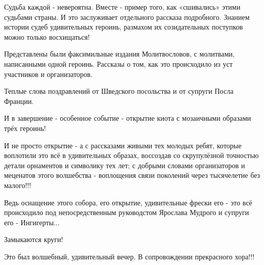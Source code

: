 Судьба каждой - невероятна. Вместе - пример того, как «сшивались» этими
судьбами страны. И это заслуживает отдельного рассказа подробного. Знанием
истории судеб удивительных героинь, размахом их созидательных поступков можно
только восхищаться! 


Представлены были факсимильные издания Молитвословов, с молитвами, написанными
одной героинь. Рассказы о том, как это происходило из уст участников и
организаторов. 

Теплые слова поздравлений от Шведского посольства и от супруги Посла Франции.

И в завершение - особенное событие - открытие киота с мозаичными образами трёх
героинь!


И не просто открытие - а с рассказами живыми тех молодых ребят, которые
воплотили это всё в удивительных образах, воссоздав со скрупулёзной точностью
детали орнаментов и символику тех лет; с добрыми словами организаторов и
меценатов этого волшебства - воплощения связи поколений через тысячелетие без
малого!!!


Ведь оснащение этого собора, его открытие, удивительные фрески его - это всё
происходило под непосредственным руководстом Ярослава Мудрого и супруги его -
Ингигерты...

Замыкаются круги! 

Это был волшебный, удивительный вечер. В сопровождении прекрасного хора!!!

